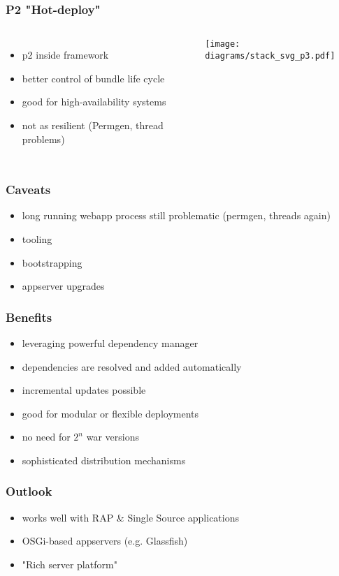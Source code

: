 \documentclass{beamer}
\begin{document}
\begin{frame}
  \frametitle{P2 "Hot-deploy"}
\begin{columns}
\column{1.5in}
  \begin{itemize}
  \item p2 inside framework\pause
  \item better control of bundle life cycle\pause
  \item good for high-availability systems\pause
  \item not as resilient (Permgen, thread problems)
  \end{itemize}      
\column{1.5in}
\texttt{[image: diagrams/stack\_svg\_p3.pdf]}
\end{columns}
\end{frame}


\begin{frame}
  \frametitle{Caveats}
  \begin{itemize}
  \item long running webapp process still problematic (permgen, threads again)\pause
  \item tooling \pause
  \item bootstrapping\pause
  \item appserver upgrades
  \end{itemize}   
\end{frame}

\begin{frame}
  \frametitle{Benefits}
  \begin{itemize}
  \item leveraging powerful dependency manager\pause
  \item dependencies are resolved and added automatically\pause
  \item incremental updates possible\pause
  \item good for modular or flexible deployments\pause
  \item no need for $2^n$ war versions\pause
  \item sophisticated distribution mechanisms
  \end{itemize}   
\end{frame}


 
\begin{frame}
  \frametitle{Outlook}
  \begin{itemize}
  \item works well with RAP \& Single Source applications\pause
  \item OSGi-based appservers (e.g. Glassfish)\pause
  \item "Rich server platform"
  \end{itemize}   
\end{frame}
\end{document}
